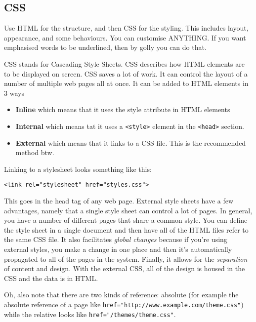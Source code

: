 \documentclass[11pt,a4paper,titlepage,dvipsnames,cmyk]{scrartcl}
\begin{document}
\subsection{CSS}%
\label{sub:CSS}
Use HTML for the structure, and then CSS for the styling. This includes
layout, appearance, and some behaviours. You can customise ANYTHING. If
you want emphasised words to be underlined, then by golly you can do that.

CSS stands for Cascading Style Sheets. CSS describes how HTML elements are
to be displayed on screen. CSS saves a lot of work. It can control the
layout of a number of multiple web pages all at once. It can be added to
HTML elements in 3 ways

\begin{itemize}
    \item \textbf{Inline} which means that it uses the style attribute in
        HTML elements
    \item \textbf{Internal} which means tat it uses a \lstinline|<style>|
        element in the \lstinline|<head>| section.
    \item \textbf{External} which means that it links to a CSS file. This
        is the recommended method btw. 
\end{itemize}

Linking to a stylesheet looks something like this:

\begin{lstlisting}[style=B]
<link rel="stylesheet" href="styles.css">
\end{lstlisting}

This goes in the head tag of any web page. External style sheets have a
few advantages, namely that a single style sheet can control a lot of
pages. In general, you have a number of different pages that share a
common style. You can define the style sheet in a single document and then
have all of the HTML files refer to the same CSS file. It also facilitates
\textit{global changes} because if you're using external styles, you make
a change in one place and then it's automatically propagated to all of the
pages in the system. Finally, it allows for the \textit{separation} of
content and design. With the external CSS, all of the design is housed in
the CSS and the data is in HTML.

Oh, also note that there are two kinds of reference: absolute (for example
the absolute reference of a page like
\lstinline|href="http://www.example.com/theme.css"|) while the relative
looks like \lstinline|href="/themes/theme.css"|.
\end{document}
